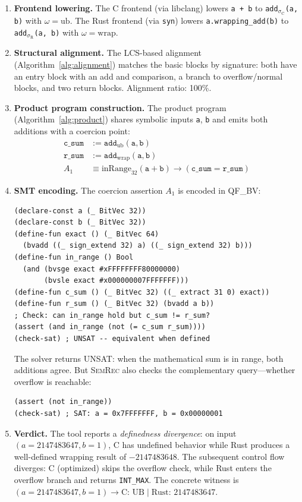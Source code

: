\documentclass[11pt]{article}
\newcommand{\SemConfigC}{\sigma_{\mathrm{C}}}
\newcommand{\SemConfigR}{\sigma_{\mathrm{R}}}
\newcommand{\inRange}{\mathrm{inRange}}
\begin{document}
\begin{enumerate}[leftmargin=*]
\item \textbf{Frontend lowering.} The C frontend (via libclang) lowers \texttt{a + b} to \texttt{add}$_{\SemConfigC}$\texttt{(a, b)} with $\omega = \mathrm{ub}$. The Rust frontend (via \texttt{syn}) lowers \texttt{a.wrapping\_add(b)} to \texttt{add}$_{\SemConfigR}$\texttt{(a, b)} with $\omega = \mathrm{wrap}$.

\item \textbf{Structural alignment.} The LCS-based alignment (Algorithm~\ref{alg:alignment}) matches the basic blocks by signature: both have an entry block with an add and comparison, a branch to overflow/normal blocks, and two return blocks. Alignment ratio: 100\%.

\item \textbf{Product program construction.} The product program (Algorithm~\ref{alg:product}) shares symbolic inputs \texttt{a}, \texttt{b} and emits both additions with a coercion point:
\begin{align*}
  \texttt{c\_sum} &:= \texttt{add}_{\mathrm{ub}}(\texttt{a}, \texttt{b}) \\
  \texttt{r\_sum} &:= \texttt{add}_{\mathrm{wrap}}(\texttt{a}, \texttt{b}) \\
  A_1 &\equiv \inRange_{32}(\texttt{a} + \texttt{b}) \to (\texttt{c\_sum} = \texttt{r\_sum})
\end{align*}

\item \textbf{SMT encoding.} The coercion assertion $A_1$ is encoded in QF\_BV:
\begin{lstlisting}[language=SMT]
(declare-const a (_ BitVec 32))
(declare-const b (_ BitVec 32))
(define-fun exact () (_ BitVec 64)
  (bvadd ((_ sign_extend 32) a) ((_ sign_extend 32) b)))
(define-fun in_range () Bool
  (and (bvsge exact #xFFFFFFFF80000000)
       (bvsle exact #x000000007FFFFFFF)))
(define-fun c_sum () (_ BitVec 32) ((_ extract 31 0) exact))
(define-fun r_sum () (_ BitVec 32) (bvadd a b))
; Check: can in_range hold but c_sum != r_sum?
(assert (and in_range (not (= c_sum r_sum))))
(check-sat) ; UNSAT -- equivalent when defined
\end{lstlisting}

The solver returns UNSAT: when the mathematical sum is in range, both additions agree. But \textsc{SemRec} also checks the complementary query---whether overflow is reachable:
\begin{lstlisting}[language=SMT]
(assert (not in_range))
(check-sat) ; SAT: a = 0x7FFFFFFF, b = 0x00000001
\end{lstlisting}

\item \textbf{Verdict.} The tool reports a \emph{definedness divergence}: on input $(a = 2147483647, b = 1)$, C has undefined behavior while Rust produces a well-defined wrapping result of $-2147483648$. The subsequent control flow diverges: C (optimized) skips the overflow check, while Rust enters the overflow branch and returns \texttt{INT\_MAX}. The concrete witness is $(a = 2147483647, b = 1) \to \text{C: UB} \mid \text{Rust: } 2147483647$.
\end{enumerate}
\end{document}
